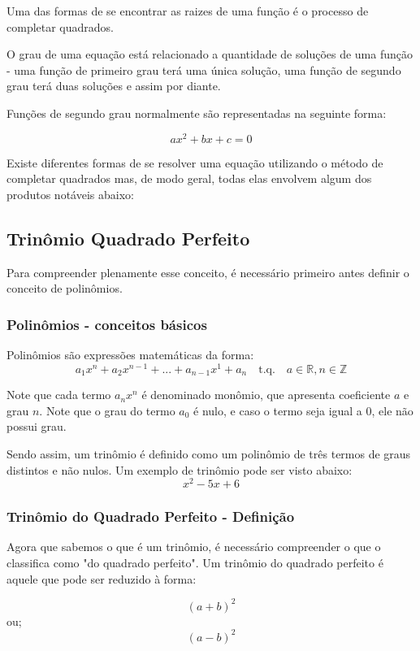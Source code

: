 \documentclass[../resumo.tex]{subfiles}
\begin{document}
	Uma das formas de se encontrar as raizes de uma função é o processo de completar quadrados.

	O grau de uma equação está relacionado a quantidade de soluções de uma função - uma função
	de primeiro grau terá uma única solução, uma função de segundo grau terá duas soluções e assim por diante.

	Funções de segundo grau normalmente são representadas na seguinte forma:

	\[ ax^2 + bx + c = 0 \]

	Existe diferentes formas de se resolver uma equação utilizando o método de completar quadrados
	mas, de modo geral, todas elas envolvem algum dos produtos notáveis abaixo:

	\subsection{Trinômio Quadrado Perfeito}

	Para compreender plenamente esse conceito, é necessário primeiro antes definir o conceito de polinômios.

	\subsubsection{Polinômios - conceitos básicos}

	Polinômios são expressões matemáticas da forma:
	\[a_1x^n + a_2x^{n-1} + ... + a_{n-1}x^1 + a_n \quad \textrm{t.q.} \quad a \in \mathbb{R}, n \in \mathbb{Z}\]

	Note que cada termo \(a_nx^n\) é denominado monômio, que apresenta coeficiente \(a\) e grau \(n\).
	Note que o grau do termo \(a_0\) é nulo, e caso o termo seja igual a 0, ele não possui grau.

	Sendo assim, um trinômio é definido como um polinômio de três termos de graus distintos e não nulos. Um exemplo de
	trinômio pode ser visto abaixo:
	\[x^2 - 5x + 6\]

	\subsubsection{Trinômio do Quadrado Perfeito - Definição}

	Agora que sabemos o que é um trinômio, é necessário compreender o que o classifica como "do 
	quadrado perfeito". Um trinômio do quadrado perfeito é aquele que pode ser reduzido à forma:

	\[(a + b)^2\]
	ou;
	\[(a - b)^2\]
\end{document}

